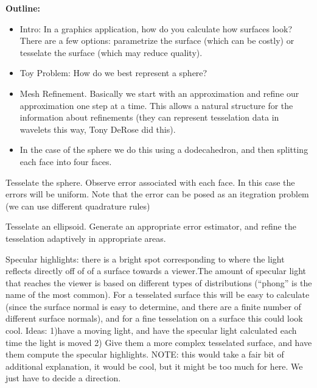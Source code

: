 

{\bf Outline:}
\begin{itemize}
\item Intro: In a graphics application, how do you calculate how surfaces look? There are a few options: parametrize the surface (which can be costly) or tesselate the surface (which may reduce quality).
\item Toy Problem: How do we best represent a sphere?
\item Mesh Refinement. Basically we start with an approximation and refine our approximation one step at a time. This allows a natural structure for the information about refinements (they can represent tesselation data in wavelets this way, Tony DeRose did this).
\item In the case of the sphere we do this using a dodecahedron, and then splitting each face into four faces.
\end{itemize}

\begin{problem}
Tesselate the sphere. Observe error associated with each face. In this case the errors will be uniform. Note that the error can be posed as an itegration problem (we can use different quadrature rules)
\end{problem}

\begin{problem}
Tesselate an ellipsoid. Generate an appropriate error estimator, and refine the tesselation adaptively in appropriate areas.
\end{problem}

\begin{problem}
Specular highlights: there is a bright spot corresponding to where the light reflects directly off of of a surface towards a viewer.The amount of specular light that reaches the viewer is based on different types of distributions (``phong'' is the name of the most common). For a tesselated surface this will be easy to calculate (since the surface normal is easy to determine, and there are a finite number of different surface normals), and for a fine tesselation on a surface this could look cool. Ideas: 1)have a moving light, and have the specular light calculated each time the light is moved 2) Give them a more complex tesselated surface, and have them compute the specular highlights. NOTE: this would take a fair bit of additional explanation, it would be cool, but it might be too much for here. We just have to decide a direction.
\end{problem}
